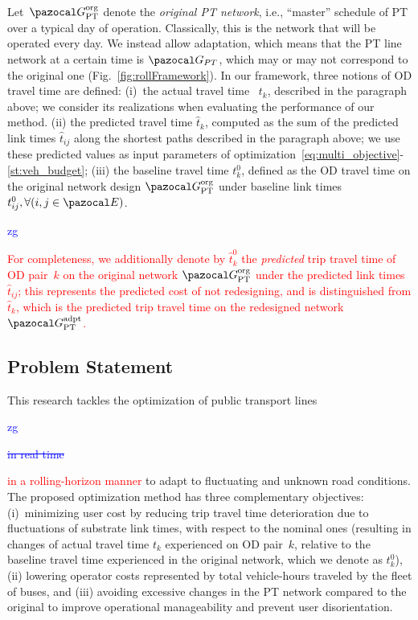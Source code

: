 \documentclass[a4paper,fleqn]{cas-sc}
\newcommand{\stkout}[1]{\ifmmode\text{\sout{\ensuremath{#1}}}\else\sout{#1}\fi}
\newcommand\rev[3]{\textcolor{blue}{\begin{scriptsize}{#1}\end{scriptsize}\stkout{#2}}\textcolor{red}{#3}}
\newcommand\rev[3]{\ignorespaces#3\ignorespaces\unskip}
\begin{document}
Let~$\pazocal G_\text{PT}^\text{org}$ denote the \emph{original PT network}, i.e., ``master'' schedule of PT over a typical day of operation. Classically, this is the network that will be operated every day. We instead allow adaptation, which means that the PT line network at a certain time is $\pazocal G_{PT}$, which may or may not correspond to the original one (Fig.~\ref{fig:rollFramework}).
%
In our framework, three notions of OD travel time are defined:
(i)~the actual travel time ~$t_k$, described in the paragraph above; we consider its realizations when evaluating the performance of our method.
(ii) the predicted travel time $\hat t_k$, computed as the sum of the predicted link times $\hat t_{ij}$ along the shortest paths described in the paragraph above; we use these predicted values as input parameters of optimization~\eqref{eq:multi_objective}-\eqref{st:veh_budget};
(iii) the baseline travel time $t_k^0$, defined as the OD travel time on the original network design $\pazocal G_\text{PT}^\text{org}$ under baseline link times $t_{ij}^0,\forall (i,j\in\pazocal E)$.
\rev{zg}{}{For completeness, we additionally denote by $\hat t_k^0$ the \emph{predicted} trip travel time of OD pair~$k$ on the original network $\pazocal G_\text{PT}^\text{org}$ under the predicted link times $\hat t_{ij}$; this represents the predicted cost of not redesigning, and is distinguished from $\hat t_k$, which is the predicted trip travel time on the redesigned network $\pazocal G_\text{PT}^\text{adpt}$.}
\subsection{Problem Statement}\label{sec:problemStatement}
This research tackles the optimization of public transport lines \rev{zg}{in real time}{in a rolling-horizon manner} to adapt to fluctuating and unknown road conditions.
%
The proposed optimization method has three complementary objectives: 
(i)~minimizing user cost by reducing trip travel time deterioration due to fluctuations of substrate link times, with respect to the nominal ones (resulting in changes of actual travel time $t_k$ experienced on OD pair~$k$, relative to the baseline travel time experienced in the original network, which we denote as $t_k^0$), 
(ii) lowering operator costs represented by total vehicle-hours traveled by the fleet of buses, and (iii) avoiding excessive changes in the PT network compared to the original to improve operational manageability and prevent user disorientation.
\end{document}
